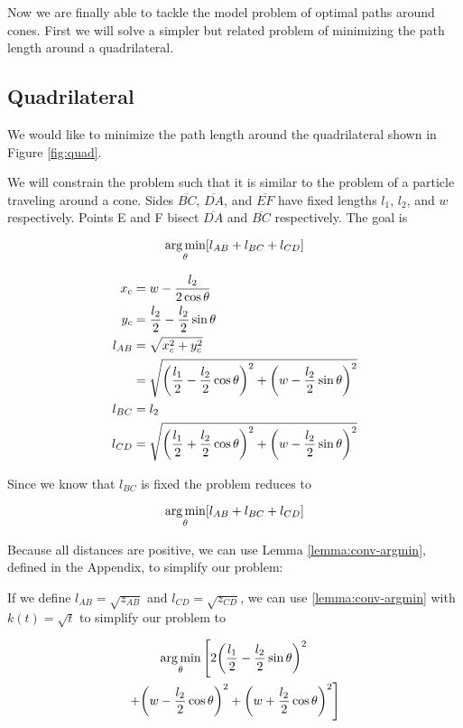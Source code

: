 Now we are finally able to tackle the model problem of optimal paths around cones. First we will solve a simpler but related problem of minimizing the path length around a quadrilateral.

\subsection{Quadrilateral}

We would like to minimize the path length around the quadrilateral shown in Figure \ref{fig:quad}.


We will constrain the problem such that it is similar to the problem of a particle traveling around a cone. Sides $\overline{BC}$, $\overline{DA}$, and $\overline{EF}$ have fixed lengths $l_1$, $l_2$, and $w$ respectively. Points E and F bisect $\overline{DA}$ and $\overline{BC}$ respectively. The goal is

\[
\argmin_{\theta} \bracket{l_{AB} + l_{BC} + l_{CD}}
\]

\begin{align}
  x_c& = w - \frac{l_2}{2 \cos{\theta}}\\
  y_c& = \frac{l_2}{2} - \frac{l_2}{2} \sin{\theta}\\
  l_{AB}& = \sqrt{x_c^2 + y_c^2}\\
  & = \sqrt{ \paren{\frac{l_1}{2} - \frac{l_2}{2} \cos\theta}^2 + \paren{w - \frac{l_2}{2} \sin\theta}^2 }\\
  l_{BC}& = l_2\\
  l_{CD}& = \sqrt{\paren{\frac{l_1}{2} + \frac{l_2}{2} \cos\theta}^2 + \paren{w - \frac{l_2}{2} \sin\theta}^2 }
\end{align}

Since we know that $l_{BC}$ is fixed the problem reduces to

\[
\argmin_{\theta} \bracket{l_{AB} + l_{BC} + l_{CD}}
\]

Because all distances are positive, we can use Lemma \ref{lemma:conv-argmin}, defined in the Appendix, to simplify our problem:

If we define $l_{AB} = \sqrt{z_{AB}}$ and $l_{CD} = \sqrt{z_{CD}}$, we can use \ref{lemma:conv-argmin} with $k(t) = \sqrt{t}$ to simplify our problem to

\begin{multline}
  \argmin_{\theta} \left[ 2\paren{\frac{l_1}{2} - \frac{l_2}{2} \sin\theta}^2 \right.\\
  \left. + \paren{w - \frac{l_2}{2} \cos\theta}^2 + \paren{w + \frac{l_2}{2} \cos\theta}^2 \right]
\end{multline}

